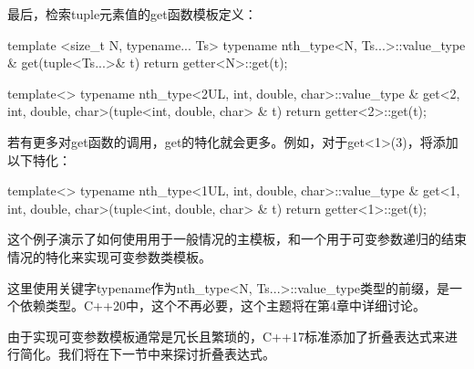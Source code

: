 最后，检索tuple元素值的get函数模板定义：

\begin{cpp}
template <size_t N, typename... Ts>
typename nth_type<N, Ts...>::value_type &
get(tuple<Ts...>& t)
{
	return getter<N>::get(t);
}

template<>
typename nth_type<2UL, int, double, char>::value_type &
get<2, int, double, char>(tuple<int, double, char> & t)
{
	return getter<2>::get(t);
}
\end{cpp}

若有更多对get函数的调用，get的特化就会更多。例如，对于get<1>(3)，将添加以下特化：

\begin{cpp}
template<>
typename nth_type<1UL, int, double, char>::value_type &
get<1, int, double, char>(tuple<int, double, char> & t)
{
	return getter<1>::get(t);
}
\end{cpp}

这个例子演示了如何使用用于一般情况的主模板，和一个用于可变参数递归的结束情况的特化来实现可变参数类模板。

这里使用关键字typename作为nth\_type<N, Ts...>::value\_type类型的前缀，是一个依赖类型。C++20中，这个不再必要，这个主题将在第4章中详细讨论。

由于实现可变参数模板通常是冗长且繁琐的，C++17标准添加了折叠表达式来进行简化。我们将在下一节中来探讨折叠表达式。



